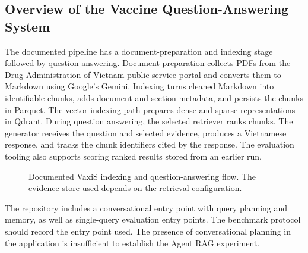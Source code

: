 \documentclass[sn-mathphys, oneside]{sn-jnl}
\begin{document}
\subsection{Overview of the Vaccine Question-Answering System}
The documented pipeline has a document-preparation and indexing stage followed by question answering. Document preparation collects PDFs from the Drug Administration of Vietnam public service portal and converts them to Markdown using Google's Gemini. Indexing turns cleaned Markdown into identifiable chunks, adds document and section metadata, and persists the chunks in Parquet. The vector indexing path prepares dense and sparse representations in Qdrant. During question answering, the selected retriever ranks chunks. The generator receives the question and selected evidence, produces a Vietnamese response, and tracks the chunk identifiers cited by the response. The evaluation tooling also supports scoring ranked results stored from an earlier run.

\begin{figure}[htbp]
\centering
\resizebox{\linewidth}{!}{}
\caption{Documented VaxiS indexing and question-answering flow. The evidence store used depends on the retrieval configuration.}
\label{fig:system}
\end{figure}

The repository includes a conversational entry point with query planning and memory, as well as single-query evaluation entry points. The benchmark protocol should record the entry point used. The presence of conversational planning in the application is insufficient to establish the Agent RAG experiment.
\end{document}
